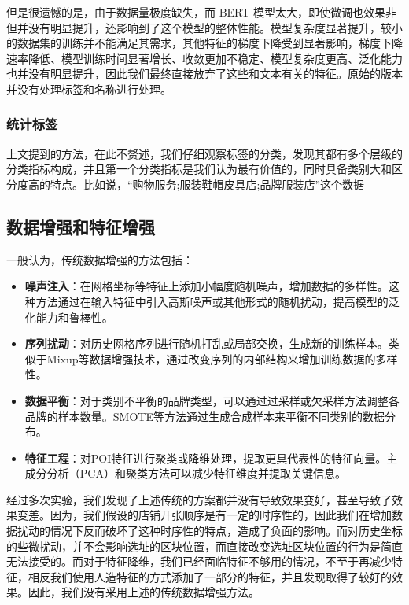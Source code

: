 \documentclass{article}
\begin{document}
但是很遗憾的是，由于数据量极度缺失，而 BERT 模型太大，即使微调也效果非但并没有明显提升，还影响到了这个模型的整体性能。模型复杂度显著提升，较小的数据集的训练并不能满足其需求，其他特征的梯度下降受到显著影响，梯度下降速率降低、模型训练时间显著增长、收敛更加不稳定、模型复杂度更高、泛化能力也并没有明显提升，因此我们最终直接放弃了这些和文本有关的特征。原始的版本并没有处理标签和名称进行处理。

\subsubsection{统计标签}

上文提到的方法，在此不赘述，我们仔细观察标签的分类，发现其都有多个层级的分类指标构成，并且第一个分类指标是我们认为最有价值的，同时具备类别大和区分度高的特点。比如说，“购物服务;服装鞋帽皮具店;品牌服装店”这个数据

\subsection{数据增强和特征增强}

一般认为，传统数据增强的方法包括：

\begin{itemize}
\item \textbf{噪声注入}：在网格坐标等特征上添加小幅度随机噪声，增加数据的多样性\cite{bishop_training_1995}。这种方法通过在输入特征中引入高斯噪声或其他形式的随机扰动，提高模型的泛化能力和鲁棒性。
\item \textbf{序列扰动}：对历史网格序列进行随机打乱或局部交换，生成新的训练样本\cite{zhang_mixup_2018}。类似于Mixup等数据增强技术，通过改变序列的内部结构来增加训练数据的多样性。
\item \textbf{数据平衡}：对于类别不平衡的品牌类型，可以通过过采样或欠采样方法调整各品牌的样本数量\cite{chawla_smote_2002}。SMOTE等方法通过生成合成样本来平衡不同类别的数据分布。
\item \textbf{特征工程}：对POI特征进行聚类或降维处理，提取更具代表性的特征向量\cite{jolliffe_principal_2016}。主成分分析（PCA）和聚类方法可以减少特征维度并提取关键信息。
\end{itemize}

经过多次实验，我们发现了上述传统的方案都并没有导致效果变好，甚至导致了效果变差。因为，我们假设的店铺开张顺序是有一定的时序性的，因此我们在增加数据扰动的情况下反而破坏了这种时序性的特点，造成了负面的影响。而对历史坐标的些微扰动，并不会影响选址的区块位置，而直接改变选址区块位置的行为是简直无法接受的。而对于特征降维，我们已经面临特征不够用的情况，不至于再减少特征，相反我们使用人造特征的方式添加了一部分的特征，并且发现取得了较好的效果。因此，我们没有采用上述的传统数据增强方法。
\end{document}
